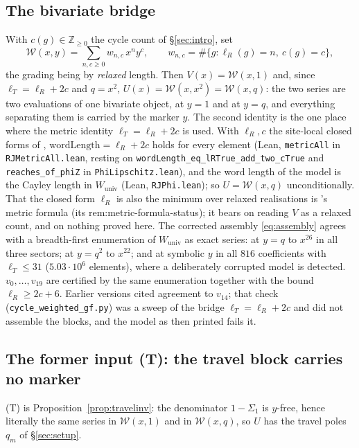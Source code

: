 \documentclass[11pt]{article}
\theoremstyle{plain}
\theoremstyle{definition}
\theoremstyle{remark}
\newcommand{\Z}{\mathbb{Z}}
\begin{document}
\subsection{The bivariate bridge}\label{sec:bridge}

With $c(g)\in\Z_{\ge0}$ the cycle count of \S\ref{sec:intro}, set
\[
   \mathcal W(x,y)=\sum_{n,c\ge0}w_{n,c}\,x^ny^c,\qquad
   w_{n,c}=\#\{g:\ell_R(g)=n,\ c(g)=c\},
\]
the grading being by \emph{relaxed} length. Then $V(x)=\mathcal W(x,1)$ and, since
$\ell_T=\ell_R+2c$ and $q=x^2$, $U(x)=\mathcal W(x,x^2)=\mathcal W(x,q)$: the two series are two
evaluations of one bivariate object, at $y=1$ and at $y=q$, and everything separating them is
carried by the marker $y$. The second identity is the one place where the metric identity
$\ell_T=\ell_R+2c$ is used. With $\ell_R,c$ the site-local closed forms of \cite{Bonfioli2026a},
$\mathrm{wordLength}=\ell_R+2c$ holds for every element (Lean, \texttt{metricAll} in
\texttt{RJMetricAll.lean}, resting on \texttt{wordLength\_eq\_lRTrue\_add\_two\_cTrue} and
\texttt{reaches\_of\_phiZ} in \texttt{PhiLipschitz.lean}), and the word length of the model is the
Cayley length in $W_{\mathrm{univ}}$ (Lean, \texttt{RJPhi.lean}); so $U=\mathcal W(x,q)$
unconditionally. That the closed form $\ell_R$ is also the minimum over relaxed realisations is
\cite{Bonfioli2026a}'s metric formula (its \textup{rem:metric-formula-status}); it bears on reading
$V$ as a relaxed count, and on nothing proved here.
The corrected assembly \eqref{eq:assembly} agrees with a breadth-first enumeration of
$W_{\mathrm{univ}}$ as exact series: at $y=q$ to $x^{26}$ in all three sectors; at $y=q^2$ to
$x^{22}$; and at symbolic $y$ in all $816$ coefficients with $\ell_T\le31$ ($5.03\cdot10^6$
elements), where a deliberately corrupted model is detected. $v_0,\dots,v_{19}$ are certified by the
same enumeration together with the bound $\ell_R\ge2c+6$. Earlier versions cited agreement to
$v_{14}$; that check (\texttt{cycle\_weighted\_gf.py}) was a sweep of the bridge
$\ell_T=\ell_R+2c$ and did not assemble the blocks, and the model as then printed fails it.

\subsection{The former input \textup{(T)}: the travel block carries no marker}\label{sec:inputT}

\textup{(T)} is Proposition~\ref{prop:travelinv}: the denominator $1-\Sigma_1$ is $y$-free, hence
literally the same series in $\mathcal W(x,1)$ and in $\mathcal W(x,q)$, so $U$ has the travel
poles $q_m$ of \S\ref{sec:setup}.
\end{document}
